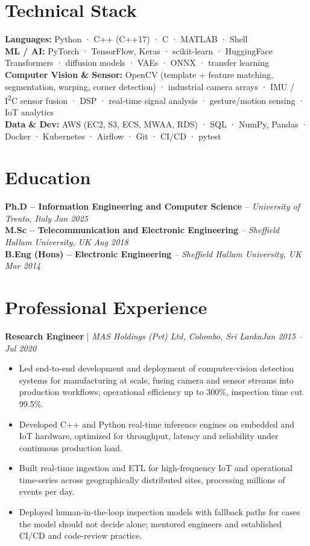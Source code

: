 \documentclass[11pt]{article}
\newenvironment{cvrole}[5]{%
  \par\noindent\textbf{\large #1} | \textit{\small #2, #3}\hfill \textit{\small #4 -- #5}\par
  \begin{itemize}[leftmargin=2em, itemsep=-0.3em, topsep=-0.5em]%
}{%
  \end{itemize}\par\noindent\mbox{}\par\vspace{0.1em}%
}
\begin{document}
\section*{Technical Stack}

\textbf{Languages:} Python · C++ (C++17) · C · MATLAB · Shell\\
\textbf{ML / AI:} PyTorch · TensorFlow, Keras · scikit-learn · HuggingFace Transformers · diffusion models · VAEs · ONNX · transfer learning\\
\textbf{Computer Vision \& Sensor:} OpenCV (template + feature matching, segmentation, warping, corner detection) · industrial camera arrays · IMU / I\textsuperscript{2}C sensor fusion · DSP · real-time signal analysis · gesture/motion sensing · IoT analytics\\
\textbf{Data \& Dev:} AWS (EC2, S3, ECS, MWAA, RDS) · SQL · NumPy, Pandas · Docker · Kubernetes · Airflow · Git · CI/CD · pytest

\section*{Education}
\textbf{Ph.D -- Information Engineering and Computer Science} \textit{\small{ -- University of Trento, Italy}} \hfill \textit{Jan 2025}\\[2pt]
\noindent\textbf{M.Sc -- Telecommunication and Electronic Engineering} \textit{\small{ -- Sheffield Hallam University, UK}} \hfill \textit{Aug 2018}\\[2pt]
\noindent\textbf{B.Eng (Hons) -- Electronic Engineering} \textit{\small{ -- Sheffield Hallam University, UK}} \hfill \textit{Mar 2014}

\section*{Professional Experience}

\begin{cvrole}{Research Engineer}{MAS Holdings (Pvt) Ltd}{Colombo, Sri Lanka}{Jan 2015}{Jul 2020}
    \item Led end-to-end development and deployment of computer-vision detection systems for manufacturing at scale, fusing camera and sensor streams into production workflows; operational efficiency up to 300\%, inspection time cut 99.5\%.
    \item Developed C++ and Python real-time inference engines on embedded and IoT hardware, optimized for throughput, latency and reliability under continuous production load.
    \item Built real-time ingestion and ETL for high-frequency IoT and operational time-series across geographically distributed sites, processing millions of events per day.
    \item Deployed human-in-the-loop inspection models with fallback paths for cases the model should not decide alone; mentored engineers and established CI/CD and code-review practice.
\end{cvrole}
\end{document}

